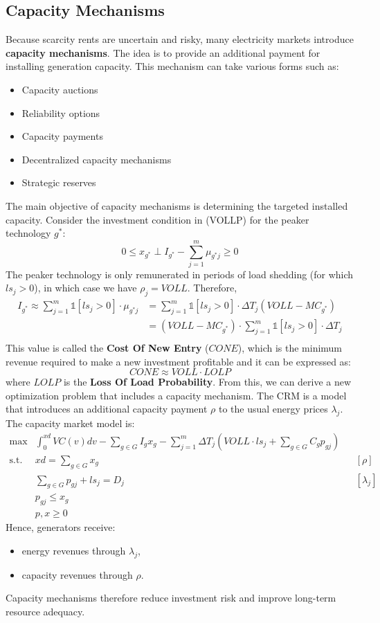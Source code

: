 \documentclass[12pt, openany]{report}
\theoremstyle{definition}
\begin{document}
\subsection{Capacity Mechanisms}
Because scarcity rents are uncertain and risky, many electricity markets introduce \textbf{capacity mechanisms}. The idea is to provide an additional payment for installing generation capacity. This mechanism can take various forms such as:
\begin{itemize}
    \item Capacity auctions
    \item Reliability options
    \item Capacity payments
    \item Decentralized capacity mechanisms
    \item Strategic reserves
\end{itemize}
The main objective of capacity mechanisms is determining the targeted installed capacity. Consider the investment condition in (VOLLP) for the peaker technology $g^*$:
\begin{equation}
    0 \leq x_{g^*} \perp I_{g^*} - \sum_{j=1}^m \mu_{g^*j} \geq 0
\end{equation}
The peaker technology is only remunerated in periods of load shedding (for
which $ls_j > 0$), in which case we have $\rho_j = VOLL$. Therefore,
\begin{equation}
    \begin{aligned}
        I_{g^*} \approx \sum_{j=1}^m \mathbb{1}[ls_j > 0] \cdot \mu_{g^*j} &= \sum_{j=1}^m \mathbb{1}[ls_j > 0] \cdot \Delta T_j (VOLL - MC_{g^*}) \\
        &= (VOLL - MC_{g^*}) \cdot \sum_{j=1}^m \mathbb{1}[ls_j > 0] \cdot \Delta T_j \\
    \end{aligned}
\end{equation}
This value is called the \textbf{Cost Of New Entry} ($CONE$), which is the minimum revenue required to make a new investment profitable and it can be expressed as:
\begin{equation}
    CONE \approx VOLL \cdot LOLP
\end{equation}
where $LOLP$ is the \textbf{Loss Of Load Probability}.
From this, we can derive a new optimization problem that includes a capacity mechanism. The CRM is a model that introduces an additional capacity payment $\rho$ to the usual energy prices $\lambda_j$. The capacity market model is:
\begin{equation}
    \begin{aligned}
        \max &\int_0^{xd}VC(v)dv - \sum_{g \in G} I_gx_g - \sum_{j=1}^m\Delta T_j \left( VOLL\cdot ls_j + \sum_{g \in G} C_g p_{gj} \right) &&\\
        \text{s.t. } &xd = \sum_{g \in G} x_g && [\rho] \\
        &\sum_{g \in G} p_{gj} + ls_j = D_j && [\lambda_j] \\
        &p_{gj} \leq x_g &&\\
        &p, x \geq 0
    \end{aligned}
\end{equation}
Hence, generators receive:
\begin{itemize}
    \item energy revenues through \(\lambda_j\),
    \item capacity revenues through \(\rho\).
\end{itemize}
Capacity mechanisms therefore reduce investment risk and improve long-term resource adequacy.
\end{document}
